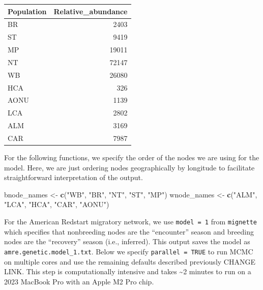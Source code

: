 \documentclass[
]{book}
\newenvironment{Shaded}{\begin{snugshade}}{\end{snugshade}}
\newcommand{\FunctionTok}[1]{\textcolor[rgb]{0.13,0.29,0.53}{\textbf{#1}}}
\newcommand{\NormalTok}[1]{#1}
\newcommand{\OtherTok}[1]{\textcolor[rgb]{0.56,0.35,0.01}{#1}}
\newcommand{\StringTok}[1]{\textcolor[rgb]{0.31,0.60,0.02}{#1}}
\begin{document}
\begin{tabular}{l|r}
\hline
Population & Relative\_abundance\\
\hline
BR & 2403\\
\hline
ST & 9419\\
\hline
MP & 19011\\
\hline
NT & 72147\\
\hline
WB & 26080\\
\hline
HCA & 326\\
\hline
AONU & 1139\\
\hline
LCA & 2802\\
\hline
ALM & 3169\\
\hline
CAR & 7987\\
\hline
\end{tabular}

For the following functions, we specify the order of the nodes we are using for the model. Here, we are just ordering nodes geographically by longitude to facilitate straightforward interpretation of the output.

\begin{Shaded}
\begin{Highlighting}[]
\NormalTok{bnode\_names }\OtherTok{\textless{}{-}} \FunctionTok{c}\NormalTok{(}\StringTok{"WB"}\NormalTok{, }\StringTok{"BR"}\NormalTok{, }\StringTok{"NT"}\NormalTok{, }\StringTok{"ST"}\NormalTok{, }\StringTok{"MP"}\NormalTok{)}
\NormalTok{wnode\_names }\OtherTok{\textless{}{-}} \FunctionTok{c}\NormalTok{(}\StringTok{"ALM"}\NormalTok{, }\StringTok{"LCA"}\NormalTok{, }\StringTok{"HCA"}\NormalTok{, }\StringTok{"CAR"}\NormalTok{, }\StringTok{"AONU"}\NormalTok{)}
\end{Highlighting}
\end{Shaded}

For the American Redstart migratory network, we use \texttt{model\ =\ 1} from \texttt{mignette} which specifies that nonbreeding nodes are the ``encounter'' season and breeding nodes are the ``recovery'' season (i.e., inferred). This output saves the model as \texttt{amre.genetic.model\_1.txt}. Below we specify \texttt{parallel\ =\ TRUE} to run MCMC on multiple cores and use the remaining defaults described previously CHANGE LINK. This step is computationally intensive and takes \textasciitilde2 minutes to run on a 2023 MacBook Pro with an Apple M2 Pro chip.
\end{document}
